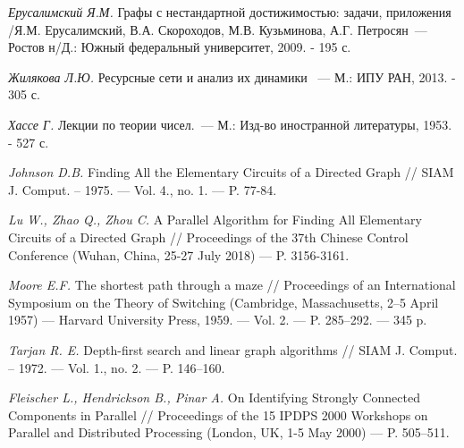 
\begin{itemize}
 \textit{Ерусалимский Я.М.} Графы с нестандартной достижимостью: задачи, приложения /Я.М. Ерусалимский, В.А. Скороходов, М.В. Кузьминова, А.Г. Петросян~--- Ростов н/Д.: Южный федеральный университет, 2009. - 195 с.

 \textit{Жилякова Л.Ю.} Ресурсные сети и анализ их динамики ~--- М.: ИПУ РАН, 2013. - 305 с.

 \textit{Хассе Г.} Лекции по теории чисел.~--- М.: Изд-во иностранной литературы, 1953. - 527 с.

 \textit{Johnson D.B.} Finding All the Elementary Circuits of a Directed Graph // SIAM J. Comput. – 1975. — Vol. 4., no. 1. — P. 77-84.

 \textit{Lu W., Zhao Q., Zhou C.} A Parallel Algorithm for Finding All Elementary Circuits of a Directed Graph // Proceedings of the 37th Chinese Control Conference (Wuhan, China, 25-27 July 2018) — P. 3156-3161.

 \textit{Moore E.F.} The shortest path through a maze // Proceedings of an International Symposium on the Theory of Switching (Cambridge, Massachusetts, 2–5 April 1957) — Harvard University Press, 1959. — Vol. 2. — P. 285–292. — 345 p.

 \textit{Tarjan R. E.} Depth-first search and linear graph algorithms // SIAM J. Comput. – 1972. — Vol. 1., no. 2. — P. 146–160. 

 \textit{Fleischer L., Hendrickson B., Pinar A.} On Identifying Strongly Connected Components in Parallel // Proceedings of the 15 IPDPS 2000 Workshops on Parallel and Distributed Processing (London, UK, 1-5 May 2000) — P. 505–511.

\end{itemize}

